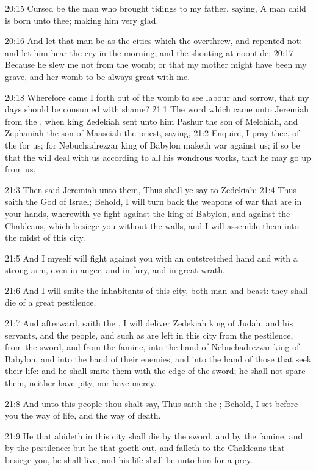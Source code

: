 20:15 Cursed be the man who brought tidings to my father, saying, A
man child is born unto thee; making him very glad.

20:16 And let that man be as the cities which the \LORD overthrew, and
repented not: and let him hear the cry in the morning, and the
shouting at noontide; 20:17 Because he slew me not from the womb; or
that my mother might have been my grave, and her womb to be always
great with me.

20:18 Wherefore came I forth out of the womb to see labour and sorrow,
that my days should be consumed with shame?  21:1 The word which came
unto Jeremiah from the \LORD, when king Zedekiah sent unto him Pashur
the son of Melchiah, and Zephaniah the son of Maaseiah the priest,
saying, 21:2 Enquire, I pray thee, of the \LORD for us; for
Nebuchadrezzar king of Babylon maketh war against us; if so be that
the \LORD will deal with us according to all his wondrous works, that
he may go up from us.

21:3 Then said Jeremiah unto them, Thus shall ye say to Zedekiah: 21:4
Thus saith the \LORD God of Israel; Behold, I will turn back the
weapons of war that are in your hands, wherewith ye fight against the
king of Babylon, and against the Chaldeans, which besiege you without
the walls, and I will assemble them into the midst of this city.

21:5 And I myself will fight against you with an outstretched hand and
with a strong arm, even in anger, and in fury, and in great wrath.

21:6 And I will smite the inhabitants of this city, both man and
beast: they shall die of a great pestilence.

21:7 And afterward, saith the \LORD, I will deliver Zedekiah king of
Judah, and his servants, and the people, and such as are left in this
city from the pestilence, from the sword, and from the famine, into
the hand of Nebuchadrezzar king of Babylon, and into the hand of their
enemies, and into the hand of those that seek their life: and he shall
smite them with the edge of the sword; he shall not spare them,
neither have pity, nor have mercy.

21:8 And unto this people thou shalt say, Thus saith the \LORD; Behold,
I set before you the way of life, and the way of death.

21:9 He that abideth in this city shall die by the sword, and by the
famine, and by the pestilence: but he that goeth out, and falleth to
the Chaldeans that besiege you, he shall live, and his life shall be
unto him for a prey.

